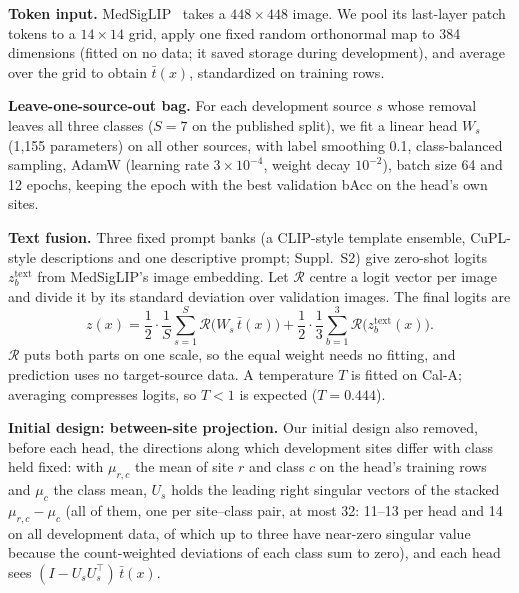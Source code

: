 \documentclass[runningheads]{llncs}
\newcommand{\sups}[1]{Suppl.~S#1}
\begin{document}
\textbf{Token input.} MedSigLIP~\cite{medgemma} takes a $448\times448$ image. We pool its last-layer patch tokens to a $14\times14$ grid, apply one fixed random orthonormal map to 384 dimensions (fitted on no data; it saved storage during development), and average over the grid to obtain $\bar t(x)$, standardized on training rows.

\textbf{Leave-one-source-out bag.} For each development source $s$ whose removal leaves all three classes ($S=7$ on the published split), we fit a linear head $W_s$ (1,155 parameters) on all other sources, with label smoothing 0.1, class-balanced sampling, AdamW (learning rate $3\times10^{-4}$, weight decay $10^{-2}$), batch size 64 and 12 epochs, keeping the epoch with the best validation bAcc on the head's own sites.

\textbf{Text fusion.} Three fixed prompt banks (a CLIP-style template ensemble, CuPL-style descriptions and one descriptive prompt; \sups{2}) give zero-shot logits $z_b^{\mathrm{text}}$ from MedSigLIP's image embedding. Let $\mathcal{R}$ centre a logit vector per image and divide it by its standard deviation over validation images. The final logits are
\begin{equation}
z(x)=\frac12\cdot\frac{1}{S}\sum_{s=1}^{S}\mathcal{R}\bigl(W_s\,\bar t(x)\bigr)+\frac12\cdot\frac13\sum_{b=1}^{3}\mathcal{R}\bigl(z^{\mathrm{text}}_b(x)\bigr).\label{eq:fusion}
\end{equation}
$\mathcal{R}$ puts both parts on one scale, so the equal weight needs no fitting, and prediction uses no target-source data. A temperature $T$ is fitted on Cal-A; averaging compresses logits, so $T<1$ is expected ($T=0.444$).

\textbf{Initial design: between-site projection.} Our initial design also removed, before each head, the directions along which development sites differ with class held fixed: with $\mu_{r,c}$ the mean of site $r$ and class $c$ on the head's training rows and $\mu_c$ the class mean, $U_s$ holds the leading right singular vectors of the stacked $\mu_{r,c}-\mu_c$ (all of them, one per site--class pair, at most 32: 11--13 per head and 14 on all development data, of which up to three have near-zero singular value because the count-weighted deviations of each class sum to zero), and each head sees $(I-U_sU_s^{\top})\,\bar t(x)$.
\end{document}
